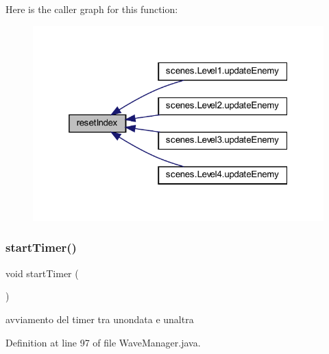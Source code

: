 Here is the caller graph for this function\+:\nopagebreak
\begin{figure}[H]
\begin{center}
\leavevmode
\includegraphics[width=319pt]{classmanagers_1_1_wave_manager_a73337f83fd9fb6c3398a8cf359422508_icgraph}
\end{center}
\end{figure}
\mbox{\label{classmanagers_1_1_wave_manager_aec53975ffc59ffaf3080db21af0d2f6e}} 
\subsubsection{\texorpdfstring{start\+Timer()}{startTimer()}}
{\footnotesize\ttfamily void start\+Timer (\begin{DoxyParamCaption}{ }\end{DoxyParamCaption})}



avviamento del timer tra un\textquotesingle{}ondata e un\textquotesingle{}altra 



Definition at line 97 of file Wave\+Manager.\+java.

